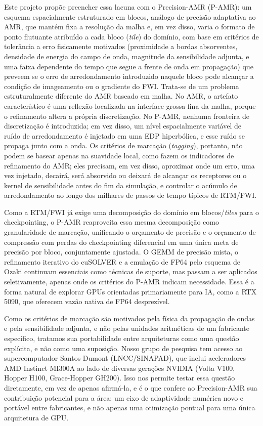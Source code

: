 \documentclass[12pt,a4paper]{article}
\newcommand{\pamr}{P\nobreakdash-AMR}
\begin{document}
Este projeto propõe preencher essa lacuna com o Precision-AMR (\pamr{}): um
esquema espacialmente estruturado em blocos, análogo de precisão adaptativa
ao AMR, que mantém fixa a resolução da malha e, em vez disso, varia o formato
de ponto flutuante atribuído a cada bloco (\emph{tile}) do domínio, com base
em critérios de tolerância a erro fisicamente motivados (proximidade a bordas
absorventes, densidade de energia do campo de onda, magnitude da
sensibilidade adjunta, e uma faixa dependente do tempo que segue a frente de
onda em propagação) que preveem se o erro de arredondamento introduzido
naquele bloco pode alcançar a condição de imageamento ou o gradiente do FWI.
Trata-se de um problema estruturalmente diferente do AMR baseado em malha. No
AMR, o artefato característico é uma reflexão localizada na interface
grossa-fina da malha, porque o refinamento altera a própria discretização.
No \pamr{}, nenhuma fronteira de discretização é introduzida; em vez disso,
um nível espacialmente variável de ruído de arredondamento é injetado em uma
EDP hiperbólica, e esse ruído se propaga junto com a onda. Os critérios de
marcação (\emph{tagging}), portanto, não podem se basear apenas na suavidade
local, como fazem os indicadores de refinamento do AMR; eles precisam, em vez
disso, aproximar onde um erro, uma vez injetado, decairá, será absorvido ou
deixará de alcançar os receptores ou o kernel de sensibilidade antes do fim
da simulação, e controlar o acúmulo de arredondamento ao longo dos milhares
de passos de tempo típicos de RTM/FWI.

Como a RTM/FWI já exige uma decomposição do domínio em blocos/\emph{tiles}
para o checkpointing, o \pamr{} reaproveita essa mesma decomposição como
granularidade de marcação, unificando o orçamento de precisão e o orçamento
de compressão com perdas do checkpointing diferencial em uma única meta de
precisão por bloco, conjuntamente ajustada. O GEMM de precisão mista, o
refinamento iterativo do cuSOLVER e a emulação de FP64 pelo esquema de Ozaki
continuam essenciais como técnicas de suporte, mas passam a ser aplicados
seletivamente, apenas onde os critérios do \pamr{} indicam necessidade.
Essa é a forma natural de explorar GPUs orientadas primariamente para IA,
como a RTX 5090, que oferecem vazão nativa de FP64 desprezível.

Como os critérios de marcação são motivados pela física da propagação de
ondas e pela sensibilidade adjunta, e não pelas unidades aritméticas de um
fabricante específico, tratamos sua portabilidade entre arquiteturas como uma
questão explícita, e não como uma suposição. Nosso grupo de pesquisa tem acesso ao supercomputador
Santos Dumont (LNCC/SINAPAD), que inclui aceleradores AMD
Instinct MI300A ao lado de diversas gerações NVIDIA (Volta V100, Hopper H100,
Grace-Hopper GH200). Isso nos permite testar essa questão diretamente, em vez
de apenas afirmá-la, e é o que confere ao Precision-AMR sua contribuição
potencial para a área: um eixo de adaptividade numérica novo e portável entre
fabricantes, e não apenas uma otimização pontual para uma única arquitetura
de GPU.
\end{document}
